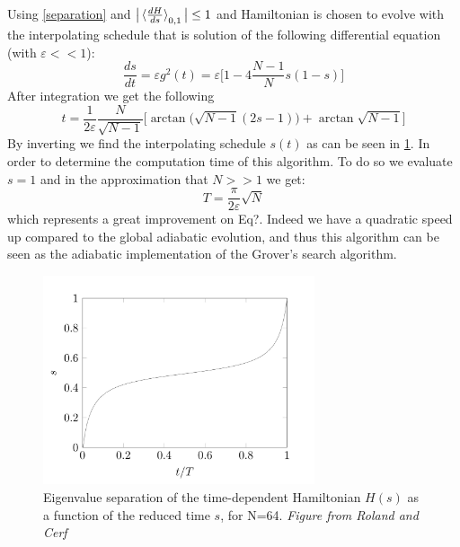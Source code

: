     Using \cref{separation} and $\big|\braket{\frac{dH}{ds}}_{0,1}\big| \leq 1$ and Hamiltonian is chosen to evolve with the interpolating schedule that is solution of the following differential equation (with $\varepsilon<<1$):
    \begin{equation}
      \frac{ds}{dt} = \varepsilon g^2(t) = \varepsilon\Big[1-4\frac{N-1}{N}s(1-s)\Big]
    \end{equation}
    After integration we get the following
    \begin{equation}
      t =\frac{1}{2\varepsilon}\frac{N}{\sqrt{N-1}}\Big[\arctan\big(\sqrt{N-1}(2s-1)\big) + \arctan{\sqrt{N-1}}\Big]
    \end{equation}
    By inverting we find the interpolating schedule $s(t)$ as can be seen in \cref{interpolating_schedule}. In order to determine the computation time of this algorithm. To do so we evaluate $s=1$ and in the approximation that $N>>1$ we get:
    \begin{equation}
      T = \frac{\pi}{2\varepsilon}\sqrt{N}
    \end{equation}
    which represents a great improvement on Eq?. Indeed we have a quadratic speed up compared to the global adiabatic evolution, and thus this algorithm can be seen as the adiabatic implementation of the Grover's search algorithm.
    \begin{figure}[h]
      \centering
      \includegraphics[width=80mm]{figures/chapter1/interpolating_schedule}
      \caption[Eigenvalue separation of the time-dependent Hamiltonian $H(s)$ as a function of the reduced time $s$, for N=64]{Eigenvalue separation of the time-dependent Hamiltonian $H(s)$ as a function of the reduced time $s$, for N=64. \textit{Figure from Roland and Cerf} \cite{Roland2002}}
      \label{interpolating_schedule}
    \end{figure}



